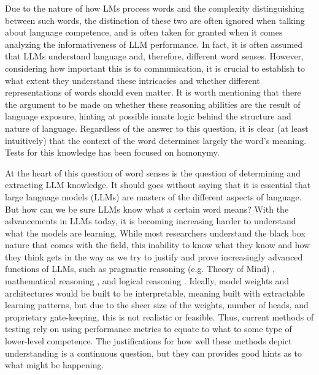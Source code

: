 \documentclass{brandeis-thesis3.2}
\theoremstyle{plain}
\theoremstyle{definition}
\theoremstyle{remark}
\numberwithin{equation}{section}
\renewcommand\cite{\citep}
\begin{document}
Due to the nature of how LMs process words and the complexity distinguishing between such words, the distinction of these two are often ignored when talking about language competence, and is often taken for granted when it comes analyzing the informativeness of LLM performance. In fact, it is often assumed that LLMs understand language and, therefore, different word senses. However, considering how important this is to communication, it is crucial to establish to what extent they understand these intricacies and whether different representations of words should even matter. It is worth mentioning that there the argument to be made on whether these reasoning abilities are the result of language exposure, hinting at possible innate logic behind the structure and nature of language. Regardless of the answer to this question, it is clear (at least intuitively) that the context of the word determines largely the word's meaning. Tests for this knowledge has been focused on homonymy. 

At the heart of this question of word senses is the question of determining and extracting LLM knowledge. It should goes without saying that it is essential that large language models (LLMs) are masters of the different aspects of language. But how can we be sure LLMs know what a certain word means? With the advancements in LLMs today, it is becoming increasing harder to understand what the models are learning. While most researchers understand the black box nature that comes with the field, this inability to know what they know and how they think gets in the way as we try to justify and prove increasingly advanced functions of LLMs, such as pragmatic reasoning (e.g. Theory of Mind) \cite{van_duijn_theory_2023}, mathematical reasoning \cite{mirzadeh_gsm-symbolic_2024}, and logical reasoning \cite{wei_chain--thought_2023}. Ideally, model weights and architectures would be built to be interpretable, meaning built with extractable learning patterns, but due to the sheer size of the weights, number of heads, and proprietary gate-keeping, this is not realistic or feasible. Thus, current methods of testing rely on using performance metrics to equate to what to some type of lower-level competence. The justifications for how well these methods depict understanding is a continuous question, but they can provides good hints as to what might be happening.
\end{document}
